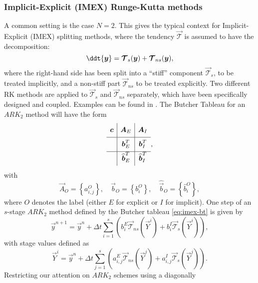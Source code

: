 \documentclass{article}
\begin{document}
\subsubsection{Implicit-Explicit (IMEX) Runge-Kutta methods}
A common setting is the case $N = 2$. This gives the typical context for
Implicit-Explicit (IMEX) splitting methods, where the tendency $\vec{\mathcal{T}}$
is assumed to have the decomposition:
\begin{equation}
	\ddt{\vec{y}} =
	\vec{\mathcal{T}}_{s}(\vec{y}) + \vec{\mathcal{T}}_{ns}(\vec{y}),
\end{equation}
where the right-hand side has been split into a ``stiff'' component $\vec{\mathcal{T}}_{s}$,
to be treated implicitly, and a non-stiff part $\vec{\mathcal{T}}_{ns}$ to be treated explicitly.
Two different RK methods are applied to $\vec{\mathcal{T}}_{s}$ and $\vec{\mathcal{T}}_{ns}$
separately, which have been specifically designed and coupled. Examples can be found in
\cite{giraldo:2013}. The Butcher Tableau for an $ARK_2$ method will have the
form
\begin{equation}\label{eq:imex-bt}
	\begin{array}{c|c|c}
	\ST \vec{c} &\vec{A}_E &\vec{A}_I\\
	\hline
	\ST  & \vec{b}_E^T & \vec{b}_I^T \\
	\hline
	\ST  & \widehat{\vec{b}}_E^T & \widehat{\vec{b}}_I^T
	\end{array},
\end{equation}
with
\begin{equation}
	\vec{A}_O = \left\lbrace a_{i, j}^O \right\rbrace, \quad
	\vec{b}_O = \left\lbrace b_{i}^O \right\rbrace, \quad
	\widehat{\vec{b}}_O = \left\lbrace \widehat{b}_{i}^O \right\rbrace,
\end{equation}
where $O$ denotes the label (either $E$ for explicit or $I$ for implicit).
One step of an $s$-stage $ARK_2$ method defined by the Butcher tableau \eqref{eq:imex-bt}
is given by
\begin{equation}
	\vec{y}^{n+1} = \vec{y}^n + \Delta t \sum_{i=1}^{s}\left(
	b_i^E \vec{\mathcal{T}}_{ns}(\vec{Y}^i) + b_i^I \vec{\mathcal{T}}_{s}(\vec{Y}^i)
	\right),
\end{equation}
with stage values defined as
\begin{equation}
	\vec{Y}^i = \vec{y}^n + \Delta t \sum_{j=1}^{s}
	\left(
	a^E_{i,j} \vec{\mathcal{T}}_{ns}(\vec{Y}^j) +
	a^I_{i,j} \vec{\mathcal{T}}_{s}(\vec{Y}^j)
	\right).
\end{equation}
Restricting our attention on $ARK_2$ schemes using a diagonally
\end{document}
